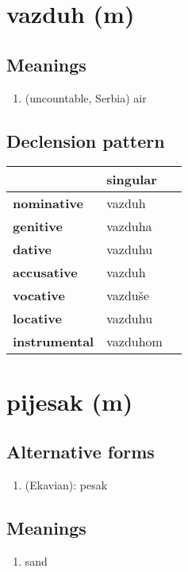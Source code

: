 \filbreak
\section{vazduh (m)}
\subsection*{Meanings}
\begin{enumerate}
\item (uncountable, Serbia) air
\end{enumerate}
\subsection*{Declension pattern}
\begin{tabularx}{\linewidth}{Xll}
\toprule
{} &  singular \\
\midrule
\textbf{nominative  } &    vazduh \\
\textbf{genitive    } &   vazduha \\
\textbf{dative      } &   vazduhu \\
\textbf{accusative  } &    vazduh \\
\textbf{vocative    } &   vazduše \\
\textbf{locative    } &   vazduhu \\
\textbf{instrumental} &  vazduhom \\
\bottomrule
\end{tabularx}

\filbreak
\section{pijesak (m)}
\subsection*{Alternative forms}
\begin{enumerate}
\item (Ekavian): pesak
\end{enumerate}
\subsection*{Meanings}
\begin{enumerate}
\item sand
\end{enumerate}
